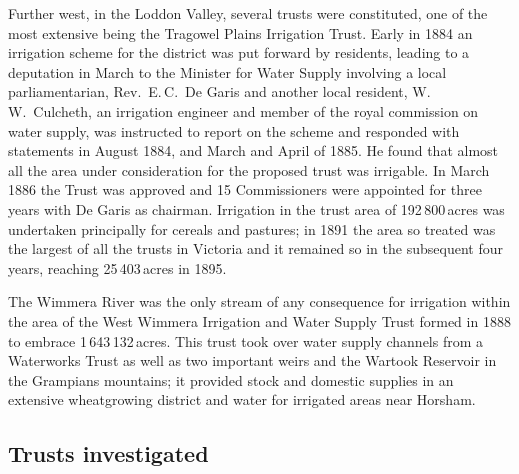 Further west, in the Loddon Valley,  several
trusts were constituted, one of the most extensive being the Tragowel
Plains Irrigation Trust. 
Early in 1884 an irrigation scheme for the district was put forward by
residents, leading to a deputation in March to the Minister for Water
Supply involving a local parliamentarian, Rev.~E.\,C.~De Garis
 and another local resident, W.\,W.~Culcheth,
 an irrigation engineer and member of the
royal commission on water supply, was instructed to report on the
scheme and responded with statements in August 1884, and March and
April of 1885.  He found that almost all the area under consideration
for the proposed trust was irrigable.  In March 1886 the Trust was
approved and 15 Commissioners were appointed for three years with De
Garis as chairman.  Irrigation in the trust area of 192\,800\,acres
was undertaken principally for cereals and
pastures; in 1891 the area so treated was the largest
of all the trusts in Victoria and it remained so in the subsequent
four years, reaching 25\,403\,acres in 1895.

The Wimmera River  was the only stream of any
consequence for irrigation within the area of the West Wimmera
Irrigation and Water Supply Trust  formed in 1888 to embrace 1\,643\,132\,acres. This trust took
over water supply channels from a
Waterworks Trust as well as two important weirs and the Wartook
Reservoir  in the Grampians mountains; it
provided stock and domestic supplies in an extensive
wheatgrowing district and water for irrigated areas near
Horsham. 

\subsection*{Trusts investigated}

